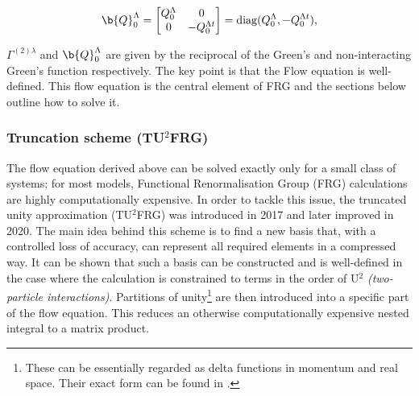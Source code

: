\documentclass[11pt]{article}
\begin{document}
\begin{equation}\label{Q0 term }
\b{Q}_0^{\Lambda} =
\begin{bmatrix}
Q_0^{\Lambda} & 0 \\
0 & -Q_0^{\Lambda t}
\end{bmatrix}
= \mathrm{diag}(Q_0^{\Lambda}, - Q_0^{\Lambda t}),
\end{equation}

\noindent $\Gamma^{(2)\lambda}$ and $\b{Q}_0^{\Lambda}$ are given by the reciprocal 
of the Green's and non-interacting Green's function respectively.
The key point is that the Flow equation is well-defined. 
This flow equation is the central element of FRG and the sections below outline how to solve it.


\subsubsection{Truncation scheme (TU$^2$FRG)}
\label{subsubsec:Truncation scheme}


The flow equation derived above can be solved exactly only for a small class of systems; for most models, Functional Renormalisation Group (FRG) 
calculations are highly computationally expensive.
In order to tackle this issue, the truncated unity approximation (TU$^2$FRG) was introduced in 2017\cite{lichtenstein2017high} and later improved in 2020\cite{eckhardt2020truncated}. 
The main idea behind this scheme is to find a new basis that, with a controlled loss of accuracy, can represent all 
required elements in a compressed way. It can be shown that such a basis can be constructed and is 
well-defined in the case where the calculation is constrained to terms in the order of U$^{2}$ \textit{(two-particle interactions)}\cite{lichtenstein2018functional}.
Partitions of unity\footnote{These can be essentially regarded as delta functions in momentum and real space. Their exact form can be found in \cite{lichtenstein2018functional}.} are then introduced into a specific part of the flow equation. This reduces an otherwise computationally expensive nested integral to a matrix product.\par
\medskip
\end{document}
